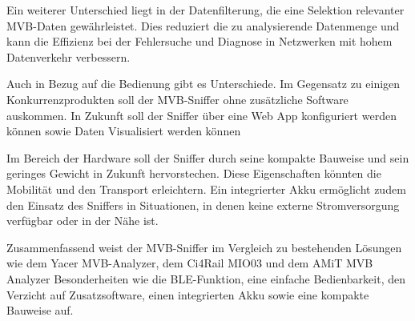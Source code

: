 Ein weiterer Unterschied liegt in der Datenfilterung, die eine Selektion relevanter MVB-Daten gewährleistet. Dies reduziert die zu analysierende Datenmenge und kann die Effizienz bei der Fehlersuche und Diagnose in Netzwerken mit hohem Datenverkehr verbessern.

Auch in Bezug auf die Bedienung gibt es Unterschiede. Im Gegensatz zu einigen Konkurrenzprodukten soll der MVB-Sniffer ohne zusätzliche Software auskommen. In Zukunft soll der Sniffer über eine Web App konfiguriert werden können sowie Daten Visualisiert werden können

Im Bereich der Hardware soll der Sniffer durch seine kompakte Bauweise und sein geringes Gewicht in Zukunft hervorstechen. Diese Eigenschaften könnten die Mobilität und den Transport erleichtern. Ein integrierter Akku ermöglicht zudem den Einsatz des Sniffers in Situationen, in denen keine externe Stromversorgung verfügbar oder in der Nähe ist.

Zusammenfassend weist der MVB-Sniffer im Vergleich zu bestehenden Lösungen wie dem Yacer MVB-Analyzer, dem Ci4Rail MIO03 und dem AMiT MVB Analyzer Besonderheiten wie die BLE-Funktion, eine einfache Bedienbarkeit, den Verzicht auf Zusatzsoftware, einen integrierten Akku sowie eine kompakte Bauweise auf.